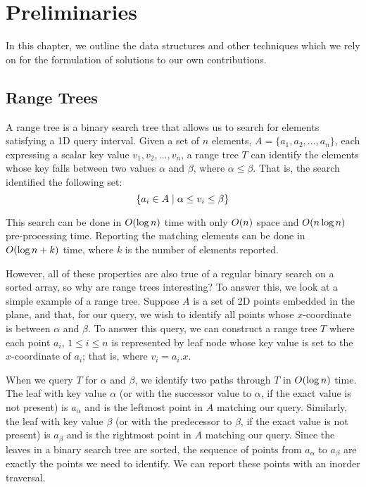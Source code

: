 \chapter{Preliminaries}
\label{:prelim}

In this chapter, we outline the data structures and other techniques which we rely on for the formulation of solutions to our own contributions.

\section{Range Trees}
\label{:prelim:range-trees}

A range tree is a binary search tree that allows us to search for elements satisfying a 1D query interval. Given a set of $n$ elements, $A = \{a_1, a_2, \ldots, a_n\}$, each expressing a scalar key value $v_1, v_2, \ldots, v_n$, a range tree $T$ can identify the elements whose key falls between two values $\alpha$ and $\beta$, where $\alpha \leq \beta$.  That is, the search identified the following set:
\[
\{ a_i \in A \;|\; \alpha \leq v_i \leq \beta \}
\]

This search can be done in $O\!\left(\log{n}\right)$ time with only $O\!\left(n\right)$ space and $O\!\left(n\log{n}\right)$ pre-processing time.  Reporting the matching elements can be done in $O\!\left(\log{n} + k\right)$ time, where $k$ is the number of elements reported. 

However, all of these properties are also true of a regular binary search on a sorted array, so why are range trees interesting? To answer this, we look at a simple example of a range tree. Suppose $A$ is a set of 2D points embedded in the plane, and that, for our query, we wish to identify all points whose $x$-coordinate is between $\alpha$ and $\beta$.  To answer this query, we can construct a range tree $T$ where each point $a_i$, $1 \leq i \leq n$ is represented by leaf node whose key value is set to the $x$-coordinate of $a_i$; that is, where $v_i = a_i.x$.

When we query $T$ for $\alpha$ and $\beta$, we identify two paths through $T$ in $O\!\left(\log{n}\right)$ time. The leaf with key value $\alpha$ (or with the successor value to $\alpha$, if the exact value is not present) is $a_\alpha$ and is the leftmost point in $A$ matching our query.  Similarly, the leaf with key value $\beta$ (or with the  predecessor to $\beta$, if the exact value is not present) is $a_\beta$ and is the rightmost point in $A$ matching our query. Since the leaves in a binary search tree are sorted, the sequence of points from $a_\alpha$ to $a_\beta$ are exactly the points we need to identify. We can report these points with an inorder traversal.

